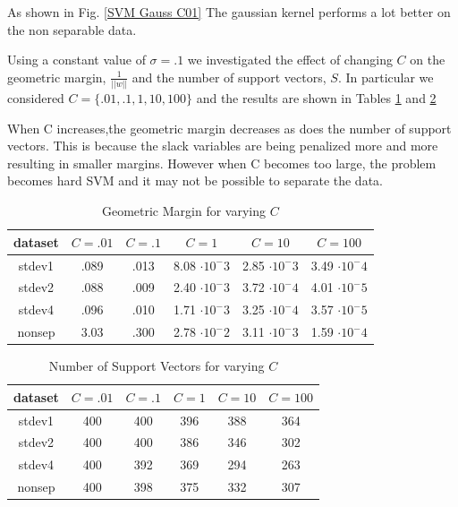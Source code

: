 \documentclass[10pt,twocolumn]{article}
\begin{document}
As shown in Fig. \ref{SVM Gauss C01} The gaussian kernel performs a lot better on the non separable data. 
       
 Using a constant value of $\sigma=.1$ we investigated the effect of changing $C$ on the geometric margin, $\frac{1}{||w||}$ and the number of support vectors, $S$. In particular we considered $C= \{.01, .1, 1, 10, 100 \}$
 and the  results are shown in Tables \ref{SVM Gauss Marg} and \ref{SVM Gauss S}
 

When C increases,the geometric margin decreases as does the number of support vectors. This is because the slack variables are being penalized more and more resulting in smaller margins. However when C becomes too large, the problem becomes hard SVM and it may not be possible to separate the data. 

 \begin{table}
 \tiny
 \caption{ Geometric Margin for varying $C$}
  \begin{tabular}{ | c | c | c | c | c | c| }
 \hline
 dataset & $C=.01$ & $C=.1$ & $C=1 $ & $C=10$ & $C=100$   \\ \hline 
 stdev1 & .089 &  .013 & 8.08 $\cdot 10^-3$ & 2.85 $\cdot 10^-3$ & 3.49 $\cdot 10^-4$ \\ \hline
 stdev2 & .088 & .009 & 2.40 $\cdot 10^-3$  & 3.72 $\cdot 10^-4$ & 4.01 $\cdot 10^-5$\\ \hline
 stdev4 & .096 & .010 & 1.71 $\cdot 10^-3$  & 3.25 $\cdot 10^-4$ & 3.57 $\cdot 10^-5$\\ \hline 
 nonsep & 3.03 & .300 & 2.78 $\cdot 10^-2$  &  3.11 $\cdot 10^-3$ & 1.59 $\cdot 10^-4$\\ \hline
 \end{tabular}
 \label{SVM Gauss Marg}
\end{table}

\begin{table}
 \scriptsize
 \caption{ Number of Support Vectors for varying $C$}
  \begin{tabular}{ | c | c | c | c | c | c| }
 \hline
 dataset & $C=.01$ & $C=.1$ & $C=1 $ & $C=10$ & $C=100$   \\ \hline 
 stdev1 & 400  &  400 & 396 & 388 & 364  \\ \hline
 stdev2 & 400 & 400 & 386  & 346 & 302 \\ \hline
 stdev4 & 400 & 392 & 369 & 294 & 263 \\ \hline 
 nonsep & 400 & 398 & 375  &  332 & 307 \\ \hline
 \end{tabular}
 \label{SVM Gauss S}
\end{table}
\end{document}
